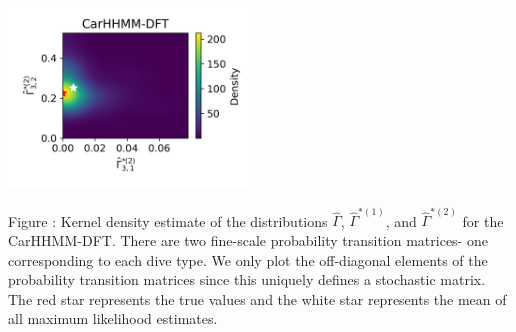 \documentclass{article}
\begin{document}
\begin{center}
        \includegraphics[width=2.5in]{../Plots/hhmm_FV_Gamma_density_1_row_2.png}
        \end{center}
        
        \noindent Figure : Kernel density estimate of the distributions $\hat \Gamma$, $\hat \Gamma^{*(1)}$, and $\hat \Gamma^{*(2)}$ for the CarHHMM-DFT. There are two fine-scale probability transition matrices- one corresponding to each dive type. We only plot the off-diagonal elements of the probability transition matrices since this uniquely defines a stochastic matrix. The red star represents the true values and the white star represents the mean of all maximum likelihood estimates.
        \addtocounter{fignum}{1}
        
        \newpage
\end{document}
